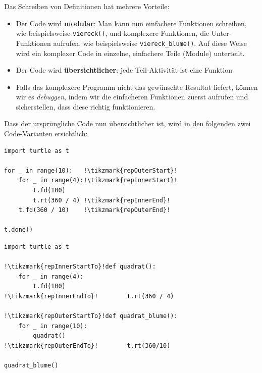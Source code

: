 \begin{myexample}
Das Schreiben von Definitionen hat mehrere Vorteile:
\begin{itemize}
	\item Der Code wird \textbf{modular}: Man kann nun einfachere Funktionen schreiben, wie beispielsweise \lstinline|viereck()|, und komplexere Funktionen, die Unter-Funktionen aufrufen, wie beispielsweise \lstinline|viereck_blume()|. Auf diese Weise wird ein komplexer Code in einzelne, einfachere Teile (Module) unterteilt.
	\item Der Code wird \textbf{übersichtlicher}: jede Teil-Aktivität ist eine Funktion
	\item Falls das komplexere Programm nicht das gewünschte Resultat liefert, können wir es \textit{debuggen}, indem wir die einfacheren Funktionen zuerst aufrufen und sicherstellen, dass diese richtig funktionieren.
\end{itemize}

Dass der ursprüngliche Code nun übersichtlicher ist, wird in den folgenden zwei Code-Varianten ersichtlich:

\begin{center}
	\begin{minipage}{.4\textwidth}
		\begin{lstlisting}[escapechar=!]
import turtle as t

for _ in range(10):   !\tikzmark{repOuterStart}!
    for _ in range(4):!\tikzmark{repInnerStart}!
        t.fd(100)
        t.rt(360 / 4) !\tikzmark{repInnerEnd}!
    t.fd(360 / 10)    !\tikzmark{repOuterEnd}!
    
t.done()
\end{lstlisting}
	\end{minipage}\hfill\begin{minipage}{.4\textwidth}
		\begin{lstlisting}[escapechar=!]
import turtle as t

!\tikzmark{repInnerStartTo}!def quadrat():
    for _ in range(4):
        t.fd(100)
!\tikzmark{repInnerEndTo}!        t.rt(360 / 4)

!\tikzmark{repOuterStartTo}!def quadrat_blume():
    for _ in range(10):
        quadrat()
!\tikzmark{repOuterEndTo}!        t.rt(360/10)

quadrat_blume()


\end{lstlisting}
\end{minipage}
\end{center}
\end{myexample}
